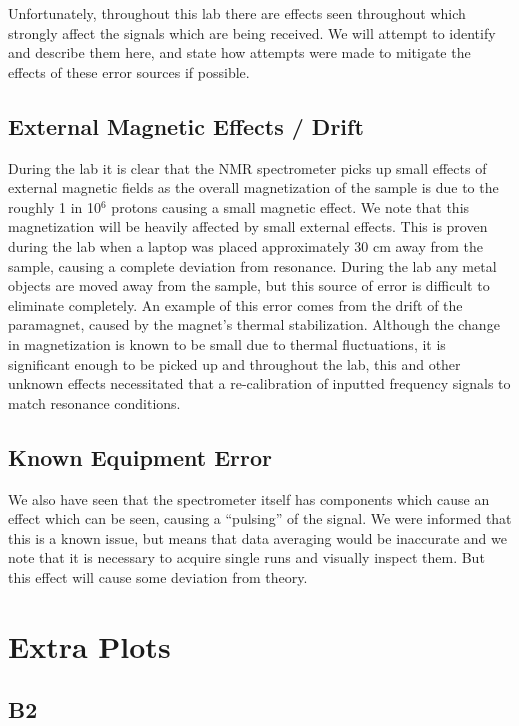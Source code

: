 Unfortunately, throughout this lab there are effects seen throughout which strongly affect the signals which are being received. We will attempt to identify and describe them here, and state how attempts were made to mitigate the effects of these error sources if possible.

\subsection{External Magnetic Effects / Drift}

During the lab it is clear that the NMR spectrometer picks up small effects of external magnetic fields as the overall magnetization of the sample is due to the roughly 1 in 10$^6$ protons causing a small magnetic effect. We note that this magnetization will be heavily affected by small external effects. This is proven during the lab when a laptop was placed approximately 30 cm away from the sample, causing a complete deviation from resonance. During the lab any metal objects are moved away from the sample, but this source of error is difficult to eliminate completely. An example of this error comes from the drift of the paramagnet, caused by the magnet's thermal stabilization. Although the change in magnetization is known to be small due to thermal fluctuations, it is significant enough to be picked up and throughout the lab, this and other unknown effects necessitated that a re-calibration of inputted frequency signals to match resonance conditions. 

\subsection{Known Equipment Error}

We also have seen that the spectrometer itself has components which cause an effect which can be seen, causing a ``pulsing'' of the signal. We were informed that this is a known issue, but means that data averaging would be inaccurate and we note that it is necessary to acquire single runs and visually inspect them. But this effect will cause some deviation from theory.

\section{Extra Plots}
\subsection{B2}

